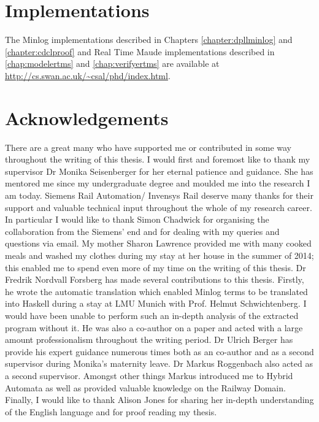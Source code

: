 \section{Implementations}
The Minlog implementations described in Chapters \ref{chapter:dpllminlog} and \ref{chapter:cdclproof} and Real Time Maude implementations described in \ref{chap:modelertms} and \ref{chap:verifyertms} are available at \url{http://cs.swan.ac.uk/~csal/phd/index.html}.

\section{Acknowledgements}
There are a great many who have supported me or contributed in some way throughout the writing of this thesis. I would first and foremost like to thank my supervisor Dr Monika Seisenberger for her eternal patience and guidance. She has mentored me since my undergraduate degree and moulded me into the research I am today. Siemens Rail Automation/ Invensys Rail deserve many thanks for their support and valuable technical input throughout the whole of my research career. In particular I would like to thank Simon Chadwick for organising the collaboration from the Siemens' end and for dealing with my queries and questions via email. My mother Sharon Lawrence provided me with many cooked meals and washed my clothes during my stay at her house in the summer of 2014; this enabled me to spend even more of my time on the writing of this thesis.
Dr Fredrik Nordvall Forsberg has made several contributions to this thesis. Firstly, he wrote the automatic translation which enabled Minlog terms to be translated into Haskell during a stay at  LMU Munich with Prof. Helmut Schwichtenberg.  I would have been unable to perform such an in-depth analysis of the extracted program without it. He was also a co-author on a paper and acted with a large amount professionalism throughout the writing period. Dr Ulrich Berger has provide his expert guidance numerous times both as an co-author and as a second supervisor during Monika's maternity leave. Dr Markus Roggenbach also acted as a second supervisor. Amongst other things Markus introduced me to Hybrid Automata as well as provided valuable knowledge on the Railway Domain. Finally, I would like to thank Alison Jones for sharing her in-depth understanding of the English language and for proof reading my thesis.



